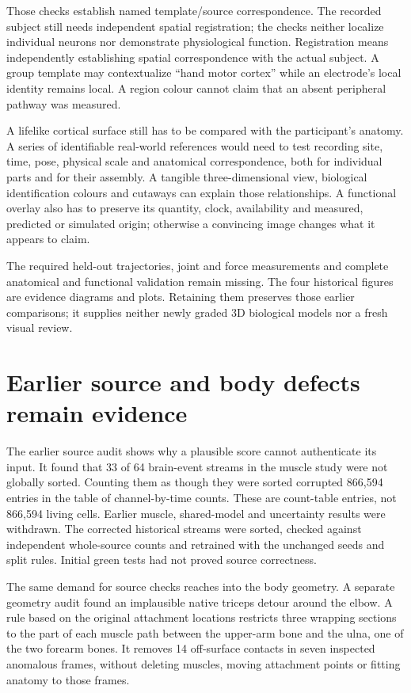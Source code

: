 Those checks establish named template/source correspondence. The recorded subject still needs independent spatial registration; the checks neither localize individual neurons nor demonstrate physiological function. Registration means independently establishing spatial correspondence
with the actual subject. A group template may contextualize ``hand motor
cortex'' while an electrode's local identity remains local. A region colour
cannot claim that an absent peripheral pathway was measured.

A lifelike cortical surface still has to be compared with the participant's anatomy. A series of identifiable real-world references would need to test recording site, time, pose, physical scale and anatomical correspondence, both for individual parts and for their assembly. A tangible three-dimensional view, biological identification colours and cutaways can explain those relationships. A functional overlay also has to preserve its quantity, clock, availability and measured, predicted or simulated origin; otherwise a convincing image changes what it appears to claim.

The required held-out trajectories, joint and force measurements and complete anatomical and functional validation remain missing. The four historical figures are evidence diagrams and plots. Retaining them preserves those earlier comparisons; it supplies neither newly graded 3D biological models nor a fresh visual review.


\section{Earlier source and body defects remain evidence}

The earlier source audit shows why a plausible score cannot authenticate its input. It found that 33 of 64 brain-event streams in the muscle study were
not globally sorted. Counting them as though they were sorted corrupted
866,594 entries in the table of channel-by-time counts. These are count-table
entries, not 866,594 living cells. Earlier muscle, shared-model and uncertainty
results were withdrawn.
The corrected historical streams were sorted, checked against independent whole-source counts
and retrained with the unchanged seeds and split rules. Initial green tests
had not proved source correctness.

The same demand for source checks reaches into the body geometry. A separate geometry audit found an implausible native triceps detour around
the elbow. A rule based on the original attachment locations restricts three
wrapping sections to the part of each muscle path between the upper-arm bone
and the ulna, one of the two forearm bones. It removes 14
off-surface contacts in seven inspected anomalous frames, without deleting
muscles, moving attachment points or fitting anatomy to those frames.

